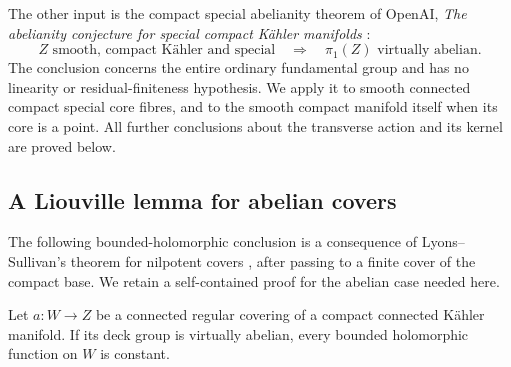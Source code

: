 The other input is the compact special abelianity theorem of OpenAI,
\emph{The abelianity conjecture for special compact K\"ahler manifolds}
\cite[Theorem~1.1]{SpecialAbelianity}:
\begin{equation}\label{grp:abelianity-input}
 Z\text{ smooth, compact K\"ahler and special}
 \quad\Longrightarrow\quad \pi_1(Z)\text{ virtually abelian}.
\end{equation}
The conclusion concerns the entire ordinary fundamental group and has
no linearity or residual-finiteness hypothesis. We apply it to smooth
connected compact special core fibres, and to the smooth compact
manifold itself when its core is a point. All further conclusions
about the transverse action and its kernel are proved below.

\subsection{A Liouville lemma for abelian covers}

The following bounded-holomorphic conclusion is a consequence of
Lyons--Sullivan's theorem for nilpotent covers
\cite[Theorem~1, p.~300]{LyonsSullivan1984}, after passing to a finite
cover of the compact base. We retain a self-contained proof for the
abelian case needed here.

\begin{lemma}\label{grp:liouville}
Let $a:W\to Z$ be a connected regular covering of a compact connected
K\"ahler manifold.  If its deck group is virtually abelian, every bounded
holomorphic function on $W$ is constant.
\end{lemma}

